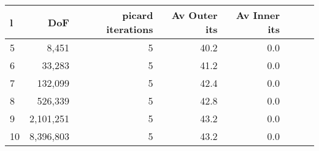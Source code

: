 \documentclass{article}
\begin{document}
\begin{tabular}{lrrrrrll}
\hline
  l &      DoF &    picard iterations & Av Outer its & Av Inner its \\
\hline
   5 &     8,451 &   5 &         40.2 &          0.0 \\
   6 &    33,283 &   5 &         41.2 &          0.0 \\
   7 &   132,099 &   5 &         42.4 &          0.0 \\
   8 &   526,339 &   5 &         42.8 &          0.0 \\
   9 &  2,101,251 &   5 &         43.2 &          0.0 \\
  10 &  8,396,803 &   5 &         43.2 &          0.0 \\
\hline
\end{tabular}
\end{document}
